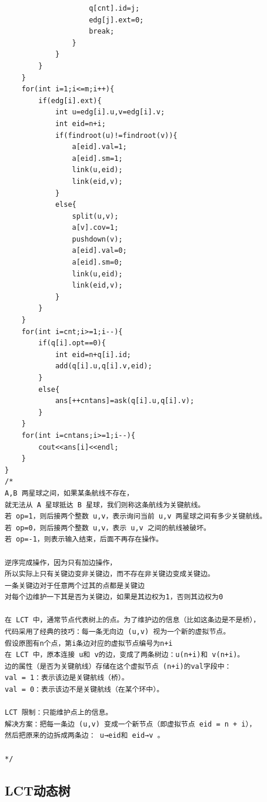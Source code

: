 \documentclass[11pt,a4paper]{ctexart}
\begin{document}
\begin{lstlisting}
					q[cnt].id=j;
					edg[j].ext=0;
					break;
				}
			}
		}
	}
	for(int i=1;i<=m;i++){
		if(edg[i].ext){
			int u=edg[i].u,v=edg[i].v;
			int eid=n+i;
			if(findroot(u)!=findroot(v)){
				a[eid].val=1;
				a[eid].sm=1;
				link(u,eid);
				link(eid,v);
			}
			else{
				split(u,v);
				a[v].cov=1;
				pushdown(v);
				a[eid].val=0;
				a[eid].sm=0;
				link(u,eid);
				link(eid,v);
			}
		}
	}
	for(int i=cnt;i>=1;i--){
		if(q[i].opt==0){
			int eid=n+q[i].id;
			add(q[i].u,q[i].v,eid);
		}
		else{
			ans[++cntans]=ask(q[i].u,q[i].v);
		}
	}
	for(int i=cntans;i>=1;i--){
		cout<<ans[i]<<endl;
	}
}
/*
A,B 两星球之间，如果某条航线不存在，
就无法从 A 星球抵达 B 星球，我们则称这条航线为关键航线。
若 op=1，则后接两个整数 u,v，表示询问当前 u,v 两星球之间有多少关键航线。
若 op=0，则后接两个整数 u,v，表示 u,v 之间的航线被破坏。
若 op=-1，则表示输入结束，后面不再存在操作。

逆序完成操作，因为只有加边操作，
所以实际上只有关键边变非关键边，而不存在非关键边变成关键边。
一条关键边对于任意两个过其的点都是关键边
对每个边维护一下其是否为关键边，如果是其边权为1，否则其边权为0 

在 LCT 中，通常节点代表树上的点。为了维护边的信息（比如这条边是不是桥），
代码采用了经典的技巧：每一条无向边 (u,v) 视为一个新的虚拟节点。
假设原图有n个点，第i条边对应的虚拟节点编号为n+i
在 LCT 中，原本连接 u和 v的边，变成了两条树边：u(n+i)和 v(n+i)。
边的属性（是否为关键航线）存储在这个虚拟节点 (n+i)的val字段中：
val = 1：表示该边是关键航线（桥）。
val = 0：表示该边不是关键航线（在某个环中）。

LCT 限制：只能维护点上的信息。
解决方案：把每一条边 (u,v) 变成一个新节点（即虚拟节点 eid = n + i），
然后把原来的边拆成两条边： u→eid和 eid→v 。

*/
\end{lstlisting}

\subsection{LCT动态树}
\end{document}
